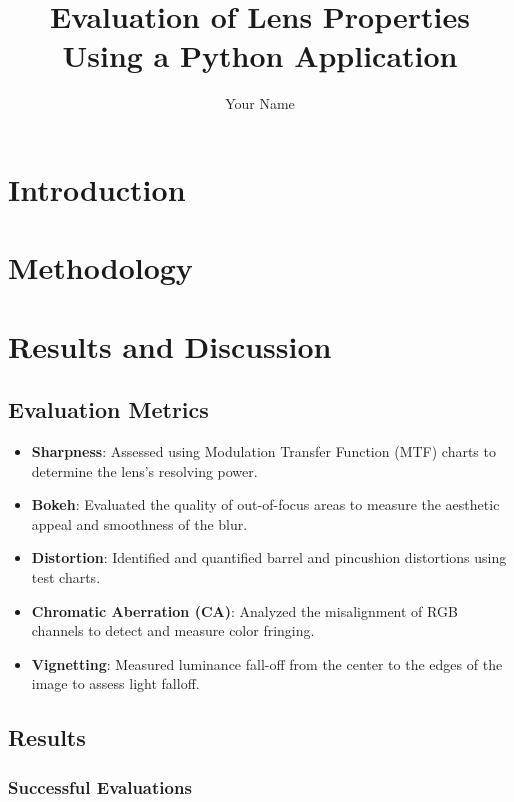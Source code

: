 \documentclass{book}
\begin{document}
\frontmatter
\title{Evaluation of Lens Properties Using a Python Application}
\author{Your Name}
\maketitle

\tableofcontents

\mainmatter

\chapter{Introduction}

\chapter{Methodology}

\chapter{Results and Discussion}
\label{chap:results}

\section{Evaluation Metrics}
\begin{itemize}
    \item \textbf{Sharpness}: Assessed using Modulation Transfer Function (MTF) charts to determine the lens's resolving power.
    \item \textbf{Bokeh}: Evaluated the quality of out-of-focus areas to measure the aesthetic appeal and smoothness of the blur.
    \item \textbf{Distortion}: Identified and quantified barrel and pincushion distortions using test charts.
    \item \textbf{Chromatic Aberration (CA)}: Analyzed the misalignment of RGB channels to detect and measure color fringing.
    \item \textbf{Vignetting}: Measured luminance fall-off from the center to the edges of the image to assess light falloff.
\end{itemize}

\section{Results}
\subsection{Successful Evaluations}
\end{document}
